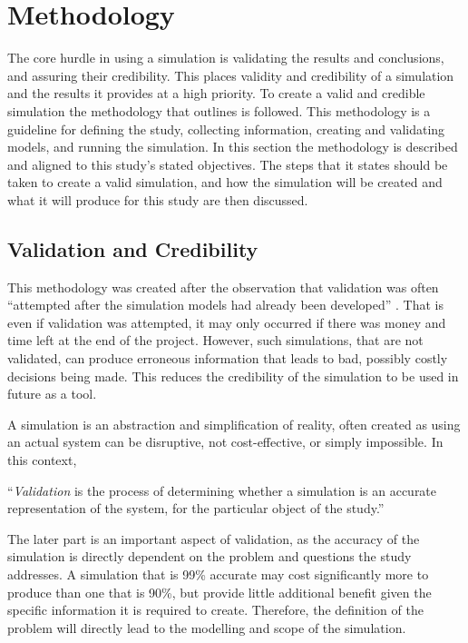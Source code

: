 \section{Methodology}
{}The core hurdle in using a simulation is validating the results and conclusions, and assuring their credibility.
{}This places validity and credibility of a simulation and the results it provides at a high priority.
{}To create a valid and credible simulation the methodology that \cite{Law2005} outlines is followed.
{}This methodology is a guideline for defining the study, collecting information, creating and validating models, and running the simulation.
{}In this section the methodology is described and aligned to this study's stated objectives. 
{}The steps that it states should be taken to create a valid simulation, and how the simulation will be created and what it will produce for this study are then discussed.

\subsection{Validation and Credibility}
This methodology was created after the observation that validation was often ``attempted after the simulation models had already been developed'' \cite{Law2005}.
That is even if validation was attempted, it may only occurred if there was money and time left at the end of the project.
However, such simulations, that are not validated, can produce erroneous information that leads to bad, possibly costly decisions being made.
This reduces the credibility of the simulation to be used in future as a tool.

A simulation is an abstraction and simplification of reality, often created as using an actual system can be disruptive, not cost-effective, or simply impossible.
In this context,

``\textit{Validation} is the process of determining whether a simulation is an accurate representation of the system, for the particular object of the study.''

The later part is an important aspect of validation, as the accuracy of the simulation is directly dependent on the problem and questions the study addresses.
A simulation that is 99\% accurate may cost significantly more to produce than one that is 90\%, but provide little additional benefit given the specific information it is required to create.
Therefore, the definition of the problem will directly lead to the modelling and scope of the simulation.

